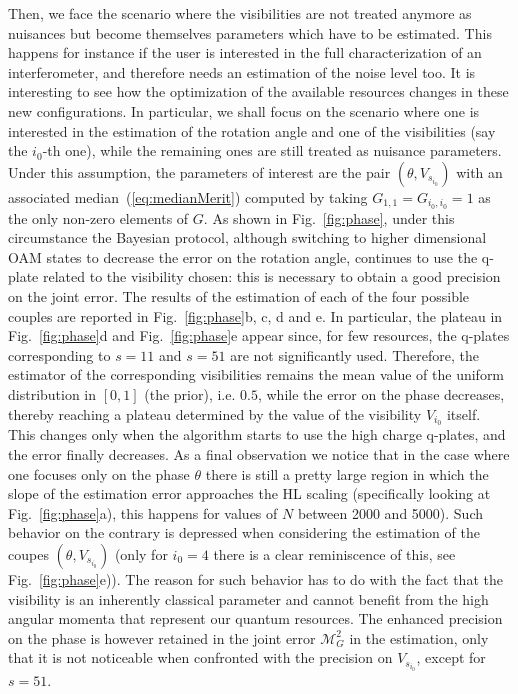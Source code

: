 \documentclass[aps,pra,twocolumn,notitlepage,superscriptaddress]{revtex4-1}
\begin{document}
Then, we face the scenario where the visibilities are not treated anymore as nuisances but become themselves parameters which have to be estimated. This happens for instance if the user is interested in the full characterization of an interferometer, and therefore needs an estimation of the noise level too. It is interesting to see how the optimization of the available resources changes in these new configurations. In particular, we shall focus on the scenario where one is interested in the estimation of the rotation angle and one of the visibilities (say the $i_0$-th one), while the remaining ones are still treated as nuisance parameters. Under this assumption, the parameters of interest are the pair $(\theta, V_{s_{i_0}})$ with an associated median~(\ref{eq:medianMerit}) computed by taking $G_{1,1}=G_{i_0,i_0}=1$ as the only non-zero elements of $G$. As shown in Fig.~\ref{fig:phase}, under this circumstance the Bayesian protocol, although switching to higher dimensional OAM states to decrease the error on the rotation angle, continues to use the q-plate related to the visibility chosen: this is necessary to obtain a good precision on the joint error. The results of the estimation of each of the four possible couples are reported in Fig.~\ref{fig:phase}b, c, d and e. In particular, the plateau in Fig.~\ref{fig:phase}d and Fig.~\ref{fig:phase}e appear since, for few resources, the q-plates corresponding to $s=11$ and $s=51$ are not significantly used. Therefore, the estimator of the corresponding visibilities remains the mean value of the uniform distribution in $[0, 1]$ (the prior), i.e. $0.5$, while the error on the phase decreases, thereby reaching a plateau determined by the value of the visibility $V_{i_0}$ itself. This changes only when the algorithm starts to use the high charge q-plates, and the error finally decreases.
%
As a final observation we notice that in the case where one focuses only on the phase $\theta$ there is still a pretty large region in which the slope of the estimation error approaches the HL scaling (specifically looking at Fig.~\ref{fig:phase}a), this happens for values of $N$ between 2000 and 5000). Such behavior on the contrary is depressed when considering the estimation of the coupes $(\theta, V_{s_{i_0}})$ (only for $i_0=4$ there is a clear reminiscence of this, see Fig.~\ref{fig:phase}e)). The reason for such behavior has to do with the fact that the visibility is an inherently classical parameter and cannot benefit from the high angular momenta that represent our quantum resources. The enhanced precision on the phase is however retained in the joint error $\mathcal{M}^2_G$ in the estimation, only that it is not noticeable when confronted with the precision on $V_{s_{i_0}}$, except for $s=51$.
\end{document}
